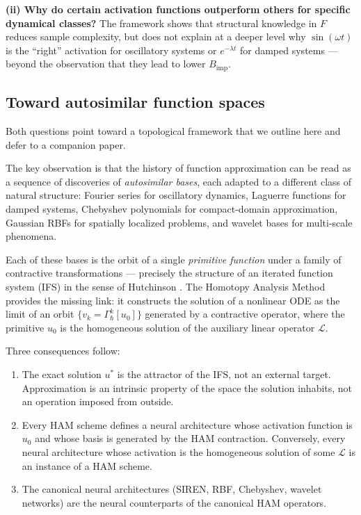 \documentclass[12pt]{article}
\begin{document}
\textbf{(ii) Why do certain activation functions outperform others
for specific dynamical classes?}
The framework shows that structural knowledge in $F$ reduces sample
complexity, but does not explain at a deeper level why
$\sin(\omega t)$ is the ``right'' activation for oscillatory systems
or $e^{-\lambda t}$ for damped systems --- beyond the observation
that they lead to lower $B_{\mathrm{imp}}$.

\subsection{Toward autosimilar function spaces}

Both questions point toward a topological framework that we outline
here and defer to a companion paper.

The key observation is that the history of function approximation
can be read as a sequence of discoveries of \emph{autosimilar bases},
each adapted to a different class of natural structure:
Fourier series for oscillatory dynamics,
Laguerre functions for damped systems,
Chebyshev polynomials for compact-domain approximation,
Gaussian RBFs for spatially localized problems,
and wavelet bases for multi-scale phenomena.

Each of these bases is the orbit of a single \emph{primitive
function} under a family of contractive transformations ---
precisely the structure of an iterated function system (IFS) in the
sense of Hutchinson \cite{Hutchinson1981}.
The Homotopy Analysis Method \cite{Liao2003, Liao2012} provides the
missing link: it constructs the solution of a nonlinear ODE as the
limit of an orbit $\{v_k = \Gamma_\hbar^k[u_0]\}$ generated by a
contractive operator, where the primitive $u_0$ is the homogeneous
solution of the auxiliary linear operator $\mathcal{L}$.

Three consequences follow:
\begin{enumerate}
  \item The exact solution $u^*$ is the attractor of the IFS, not an
    external target.
    Approximation is an intrinsic property of the space the solution
    inhabits, not an operation imposed from outside.
  \item Every HAM scheme defines a neural architecture whose
    activation function is $u_0$ and whose basis is generated by the
    HAM contraction.
    Conversely, every neural architecture whose activation is the
    homogeneous solution of some $\mathcal{L}$ is an instance of a
    HAM scheme.
  \item The canonical neural architectures (SIREN, RBF, Chebyshev,
    wavelet networks) are the neural counterparts of the canonical
    HAM operators.
\end{enumerate}
\end{document}

